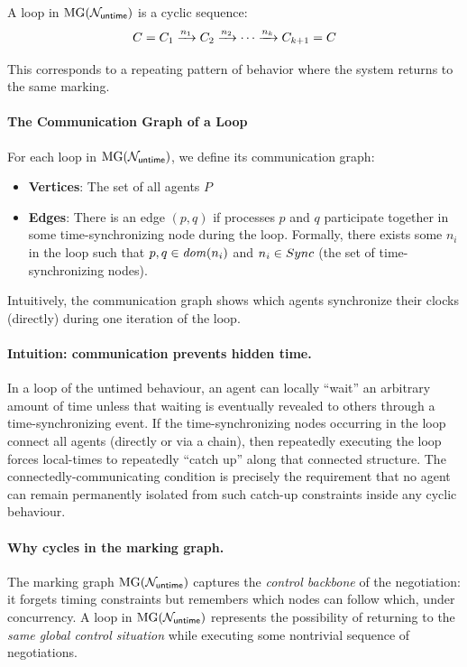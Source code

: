 A loop in $\operatorname{MG}(\mathcal{N}_{\mathsf{untime}})$ is a cyclic sequence:
\[
C = C_1 \xrightarrow{n_1} C_2 \xrightarrow{n_2} \cdots \xrightarrow{n_k} C_{k+1} = C
\]

This corresponds to a repeating pattern of behavior where the system returns to the same marking.

\paragraph*{The Communication Graph of a Loop}

For each loop in $\operatorname{MG}(\mathcal{N}_{\mathsf{untime}})$, we define its communication graph:
\begin{itemize}
\item \textbf{Vertices}: The set of all agents $P$
\item \textbf{Edges}: There is an edge $(p,q)$ if processes $p$ and $q$ participate together in some time-synchronizing node during the loop. Formally, there exists some $n_i$ in the loop such that $p, q \in \mathit{dom}(n_i)$ and $n_i \in Sync$ (the set of time-synchronizing nodes).
\end{itemize}

Intuitively, the communication graph shows which agents synchronize their clocks (directly) during one iteration of the loop.

\paragraph*{Intuition: communication prevents hidden time.}
In a loop of the untimed behaviour, an agent can locally ``wait'' an arbitrary amount of time unless that waiting is eventually revealed to others through a time-synchronizing event.
If the time-synchronizing nodes occurring in the loop connect all agents (directly or via a chain), then repeatedly executing the loop forces local-times to repeatedly ``catch up'' along that connected structure.
The connectedly-communicating condition is precisely the requirement that no agent can remain permanently isolated from such catch-up constraints inside any cyclic behaviour.

\paragraph*{Why cycles in the marking graph.}
The marking graph $\operatorname{MG}(\mathcal{N}_{\mathsf{untime}})$ captures the \emph{control backbone} of the negotiation: it forgets timing constraints but remembers which nodes can follow which, under concurrency. A loop in $\operatorname{MG}(\mathcal{N}_{\mathsf{untime}})$ represents the possibility of returning to the \emph{same global control situation} while executing some nontrivial sequence of negotiations.

